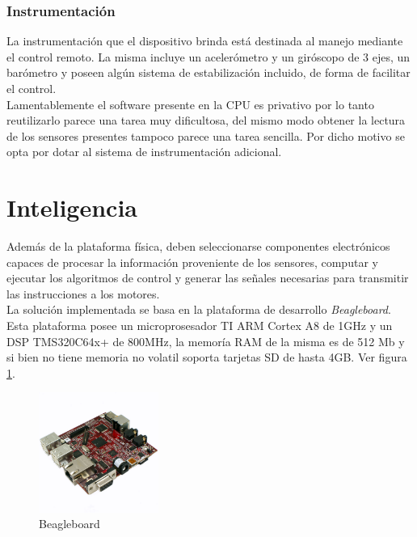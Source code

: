 \documentclass[main]{subfiles}
\begin{document}
\subsubsection*{Instrumentaci\'on}

	La instrumentaci\'on que el dispositivo brinda est\'a destinada al manejo mediante el control remoto. La misma incluye un aceler\'ometro y un gir\'oscopo de 3 ejes, un bar\'ometro y poseen alg\'un sistema de estabilizaci\'on incluido, de forma de facilitar el control. \\

Lamentablemente el software presente en la CPU es privativo por lo tanto reutilizarlo parece una tarea muy dificultosa, del mismo modo obtener la lectura de los sensores presentes tampoco parece una tarea sencilla. Por dicho motivo se opta por dotar al sistema de instrumentaci\'on adicional. 



\section{Inteligencia}

Adem\'as de la plataforma f\'isica, deben seleccionarse componentes electr\'onicos capaces de procesar la informaci\'on proveniente de los sensores, computar y ejecutar los algoritmos de control y generar las se\~nales necesarias para transmitir las instrucciones a los motores.\\

La soluci\'on implementada se basa en la plataforma de desarrollo \emph{Beagleboard}. Esta plataforma posee un microprosesador TI ARM Cortex A8 de 1GHz y un DSP TMS320C64x+ de 800MHz, la memor\'ia RAM de la misma es de 512 Mb y si bien no tiene memoria no volatil soporta tarjetas SD de hasta 4GB. Ver figura \ref{fig:beagleboard}.

\begin{figure}[!h]
	\centering
	\includegraphics[width=0.35\textwidth]{./pics_eleccion_hardware/beagle.pdf}
	\caption{Beagleboard}
	\label{fig:beagleboard}
\end{figure}
\end{document}

